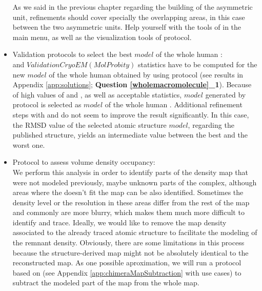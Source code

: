 \begin{itemize}
As we said in the previous chapter regarding the building of the asymmetric unit, refinements should cover specially the overlapping areas, in this case between the two asymmetric units. Help yourself with the \coot tools of  in the main menu, as well as the visualization tools of \phenix {} protocol.\\

 \item Validation protocols to select the best $model$ of the whole human :\\
 
 \emringer and $Validation CryoEM (MolProbity)$ statistics have to be computed for the new $model$ of the whole human  obtained by using \chimera {} protocol (see results  in Appendix \ref{app:solutions}; \textbf{Question \ref{wholemacromolecule}\_1}). Because of high values of \ccmask and \emringer {}, as well as acceptable \molprobity statistics, $model$ generated by \chimera {} protocol is selected as $model$ of the whole human . Additional refinement steps with \phenix {} and  do not seem to improve the result significantly. In this case, the RMSD value of the selected atomic structure $model$, regarding the published structure, yields an intermediate value between the best and the worst one.\\
 
 \item Protocol  to assess volume density occupancy:\\
 
 We perform this analysis in order to identify parts of the density map that were not modeled previously, maybe unknown parts of the complex, although areas where the  doesn't fit the map can be also identified. Sometimes the density level or the resolution in these areas differ from the rest of the map and commonly are more blurry, which makes them much more difficult to identify and trace. Ideally, we would like to remove the map density associated to the already traced atomic structure to facilitate the modeling of the remnant density. Obviously, there are some limitations in this process because the structure-derived map might not be absolutely identical to the reconstructed map. As one possible aproximation, we will run a protocol based on \chimera (see Appendix \ref{app:chimeraMapSubtraction} with use cases) to subtract the modeled part of the map from the whole map.
 

\end{itemize}
